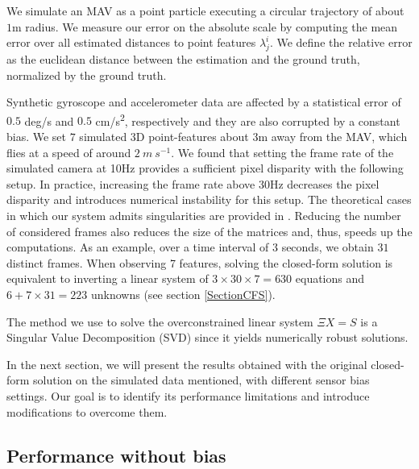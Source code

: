\documentclass[letterpaper, 10 pt, journal, twoside]{IEEEtran}  %
\begin{document}
We simulate an MAV as a point particle executing a circular trajectory of about $1$m radius.
We measure our error on the absolute scale by computing the mean error over all estimated distances to point features $\lambda_j^i$.
We define the relative error as the euclidean distance between the estimation and the ground truth,
normalized by the ground truth.

Synthetic gyroscope and accelerometer data are affected by a statistical error of $0.5$ deg/s and $0.5$ cm/s\textsuperscript{2}, respectively and they are also corrupted by a constant bias.
We set $7$ simulated 3D point-features about $3$m away from the MAV, which flies at a speed of around $2~m~s^{-1}$.
We found that setting the frame rate of the simulated camera at 10Hz provides a sufficient pixel disparity with the following setup.
In practice, increasing the frame rate above 30Hz decreases the pixel disparity and introduces numerical instability for this setup.
The theoretical cases in which our system admits singularities are provided in \cite{Martinelli2012, Martinelli2014}.
Reducing the number of considered frames also reduces the size of the matrices and, thus, speeds up the computations.
As an example, over a time interval of 3 seconds, we obtain $31$ distinct frames.
When observing 7 features, solving the closed-form solution is equivalent to inverting a linear system of $3\times 30\times 7 = 630$ equations and $6+7\times 31=223$ unknowns (see section \ref{SectionCFS}).

The method we use to solve the overconstrained linear system $\Xi X = S$ is a Singular Value Decomposition (SVD) since it yields numerically robust solutions.

In the next section, we will present the results obtained with the original closed-form solution on the simulated data mentioned, with different sensor bias settings.
Our goal is to identify its performance limitations and introduce modifications to overcome them.



\subsection{Performance without bias}
\end{document}
